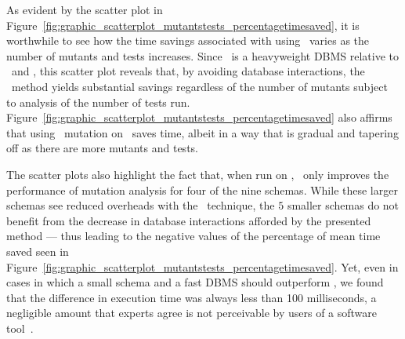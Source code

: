 

 As evident by the scatter plot in Figure~\ref{fig:graphic_scatterplot_mutantstests_percentagetimesaved}, it is worthwhile to see how the time savings associated with using \virtualmutationanalysis~varies as the number of mutants and tests increases. Since \postgres~is a heavyweight DBMS relative to \HyperSQL~and \sqlite, this scatter plot reveals that, by avoiding database interactions, the \virtual~method yields substantial savings regardless of the number of mutants subject to analysis of the number of tests run.  Figure~\ref{fig:graphic_scatterplot_mutantstests_percentagetimesaved} also affirms that using \virtual~mutation on \HyperSQL~saves time, albeit in a way that is gradual and tapering off as there are more mutants and tests.


The scatter plots also highlight the fact that, when run on \sqlite, \virtual~only improves the performance of mutation analysis for four of the nine schemas. While these larger schemas see reduced overheads with the \virtual~technique, the $5$ smaller schemas do not benefit from the decrease in database interactions afforded by the presented method --- thus leading to the negative values of the percentage of mean time saved seen in Figure~\ref{fig:graphic_scatterplot_mutantstests_percentagetimesaved}. Yet, even in cases in which a small schema and a fast DBMS should outperform \vma, we found that the difference in execution time was always less than 100 milliseconds, a negligible amount that experts agree is not perceivable by users of a software tool~\cite{Neumann2015}.


